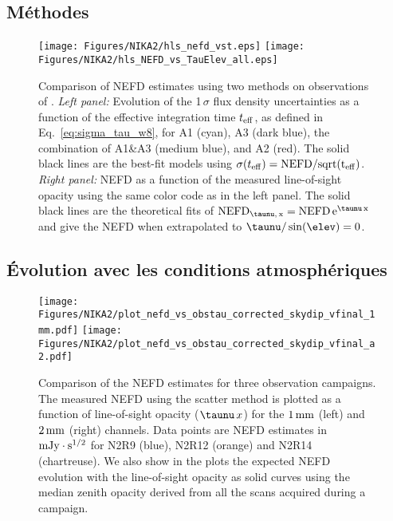 \subsection{Méthodes}

{\color{vert}\lipsum[1-2]}

\begin{figure}[!thbp]
  \begin{center}
    \texttt{[image: Figures/NIKA2/hls\_nefd\_vst.eps]}
    \texttt{[image: Figures/NIKA2/hls\_NEFD\_vs\_TauElev\_all.eps]}
    \caption{Comparison of NEFD estimates using two methods on observations of
      \hls. \emph{Left panel:} Evolution of the 1\,$\sigma$ flux density
      uncertainties as a function of the effective integration time
      $t_{\rm{eff}}$, as defined in Eq.~\ref{eq:sigma_tau_w8}, for A1
    (cyan), A3 (dark blue), the combination of A1\&A3 (medium blue),
    and A2 (red). The solid black lines are the best-fit models using
    $\sigma(t_{\rm{eff}}) =  \rm{NEFD}/sqrt(t_{\rm{eff}})$. \emph{Right panel:} NEFD as a function of the
    measured line-of-sight opacity using the same color code as in the
    left panel. The solid black lines are the theoretical
    fits of $\rm{NEFD}_{\taunu,\, x } = \rm{NEFD}\, e^{\taunu\,x}$ and give the
    NEFD when extrapolated to $\taunu/\sin(\elev)= 0$. }
    \label{fig:nefd_twomethods}
  \end{center}
\end{figure}

\subsection{\'Evolution avec les conditions atmosphériques}

{\color{vert}\lipsum[1-2]}

\begin{figure}[!thbp]
\begin{center}
  \texttt{[image: Figures/NIKA2/plot\_nefd\_vs\_obstau\_corrected\_skydip\_vfinal\_1mm.pdf]}
  \texttt{[image: Figures/NIKA2/plot\_nefd\_vs\_obstau\_corrected\_skydip\_vfinal\_a2.pdf]}
  \caption{Comparison of the NEFD estimates for three observation
    campaigns. The measured NEFD using the scatter method is plotted as a function of
    line-of-sight opacity ($\taunu\,x$) for the $1\,\rm{mm}$ (left) and $2\,\rm{mm}$ (right)
    channels. Data points are NEFD estimates in $\rm{mJy}\cdot s^{1/2}$ for N2R9 (blue), N2R12 (orange)
    and N2R14 (chartreuse). We also show in the plots the expected NEFD evolution
    with the line-of-sight opacity as solid curves using the median
    zenith opacity derived from all the scans acquired during a campaign.}
  \label{fig:nefdvsbackground_below_1Jy}
\end{center}
\end{figure}
